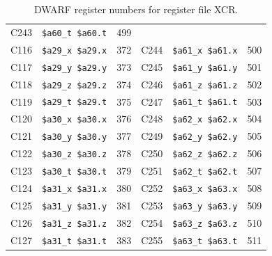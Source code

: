 \begin{table}
\begin{center}
{\begin{tabular}{|l|l|l||l|l|l|}
C243 & \verb|$a60_t $a60.t| & 499 \\
C116 & \verb|$a29_x $a29.x| & 372 &
C244 & \verb|$a61_x $a61.x| & 500 \\
C117 & \verb|$a29_y $a29.y| & 373 &
C245 & \verb|$a61_y $a61.y| & 501 \\
C118 & \verb|$a29_z $a29.z| & 374 &
C246 & \verb|$a61_z $a61.z| & 502 \\
C119 & \verb|$a29_t $a29.t| & 375 &
C247 & \verb|$a61_t $a61.t| & 503 \\
C120 & \verb|$a30_x $a30.x| & 376 &
C248 & \verb|$a62_x $a62.x| & 504 \\
C121 & \verb|$a30_y $a30.y| & 377 &
C249 & \verb|$a62_y $a62.y| & 505 \\
C122 & \verb|$a30_z $a30.z| & 378 &
C250 & \verb|$a62_z $a62.z| & 506 \\
C123 & \verb|$a30_t $a30.t| & 379 &
C251 & \verb|$a62_t $a62.t| & 507 \\
C124 & \verb|$a31_x $a31.x| & 380 &
C252 & \verb|$a63_x $a63.x| & 508 \\
C125 & \verb|$a31_y $a31.y| & 381 &
C253 & \verb|$a63_y $a63.y| & 509 \\
C126 & \verb|$a31_z $a31.z| & 382 &
C254 & \verb|$a63_z $a63.z| & 510 \\
C127 & \verb|$a31_t $a31.t| & 383 &
C255 & \verb|$a63_t $a63.t| & 511 \\
\hline \end{tabular}
}
\end{center}
\caption{DWARF register numbers for register file XCR.}
\label{table:DwarfId-XCR}
\end{table}

